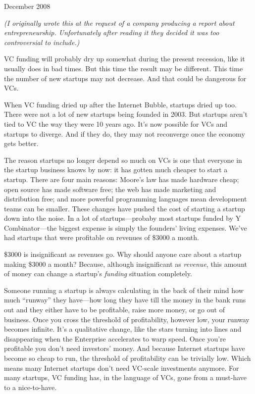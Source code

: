 December 2008

\emph{(I originally wrote this at the request of a company producing a
report about entrepreneurship. Unfortunately after reading it they
decided it was too controversial to include.)}

VC funding will probably dry up somewhat during the present recession,
like it usually does in bad times. But this time the result may be
different. This time the number of new startups may not decrease. And
that could be dangerous for VCs.

When VC funding dried up after the Internet Bubble, startups dried up
too. There were not a lot of new startups being founded in 2003. But
startups aren't tied to VC the way they were 10 years ago. It's now
possible for VCs and startups to diverge. And if they do, they may not
reconverge once the economy gets better.

The reason startups no longer depend so much on VCs is one that everyone
in the startup business knows by now: it has gotten much cheaper to
start a startup. There are four main reasons: Moore's law has made
hardware cheap; open source has made software free; the web has made
marketing and distribution free; and more powerful programming languages
mean development teams can be smaller. These changes have pushed the
cost of starting a startup down into the noise. In a lot of
startups---probaby most startups funded by Y Combinator---the biggest
expense is simply the founders' living expenses. We've had startups that
were profitable on revenues of \$3000 a month.

\$3000 is insignificant as revenues go. Why should anyone care about a
startup making \$3000 a month? Because, although insignificant as
\emph{revenue}, this amount of money can change a startup's
\emph{funding} situation completely.

Someone running a startup is always calculating in the back of their
mind how much ``runway'' they have---how long they have till the money
in the bank runs out and they either have to be profitable, raise more
money, or go out of business. Once you cross the threshold of
profitability, however low, your runway becomes infinite. It's a
qualitative change, like the stars turning into lines and disappearing
when the Enterprise accelerates to warp speed. Once you're profitable
you don't need investors' money. And because Internet startups have
become so cheap to run, the threshold of profitability can be trivially
low. Which means many Internet startups don't need VC-scale investments
anymore. For many startups, VC funding has, in the language of VCs, gone
from a must-have to a nice-to-have.

